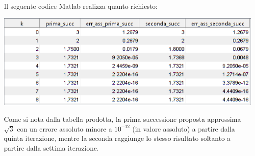 Il seguente codice Matlab realizza quanto richiesto:
\\



\begin{center}
	\includegraphics[scale=1]{cap1/es6.png}
\end{center}

Come si nota dalla tabella prodotta, la prima successione proposta approssima \(\sqrt3\) con un errore assoluto minore a \(10^{-12}\) (in valore assoluto) a partire dalla quinta iterazione, mentre la seconda raggiunge lo stesso risultato soltanto a partire dalla settima iterazione.
